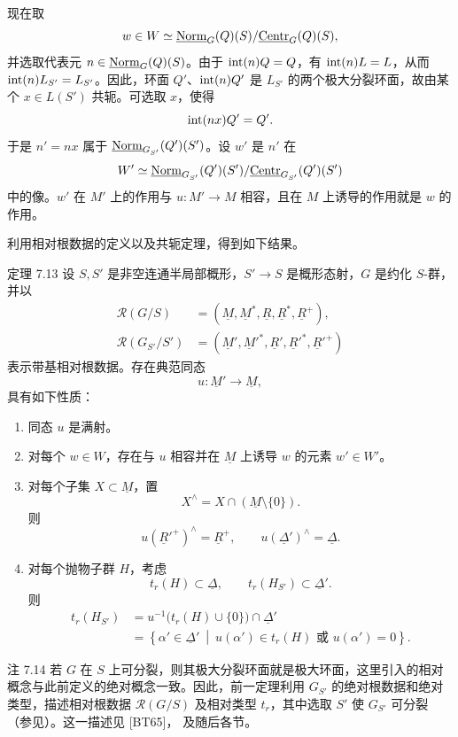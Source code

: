 现在取
\[
 w\in W\simeq\underline{\operatorname{Norm}}_G(Q)(S)/\underline{\operatorname{Centr}}_G(Q)(S),
\]
并选取代表元 \(n\in\underline{\operatorname{Norm}}_G(Q)(S)\)。由于 \(\operatorname{int}(n)Q=Q\)，有 \(\operatorname{int}(n)L=L\)，从而 \(\operatorname{int}(n)L_{S'}=L_{S'}\)。因此，环面 \(Q'\)、\(\operatorname{int}(n)Q'\) 是 \(L_{S'}\) 的两个极大分裂环面，故由某个 \(x\in L(S')\) 共轭。可选取 \(x\)，使得
\[
 \operatorname{int}(nx)Q'=Q'.
\]
于是 \(n'=nx\) 属于 \(\underline{\operatorname{Norm}}_{G_{S'}}(Q')(S')\)。设 \(w'\) 是 \(n'\) 在
\[
 W'\simeq
 \underline{\operatorname{Norm}}_{G_{S'}}(Q')(S')/\underline{\operatorname{Centr}}_{G_{S'}}(Q')(S')
\]
中的像。\(w'\) 在 \(M'\) 上的作用与 \(u:M'\to M\) 相容，且在 \(M\) 上诱导的作用就是 \(w\) 的作用。

利用相对根数据的定义以及共轭定理，得到如下结果。

\begin{sgastatement}{定理 7.13}
设 \(S,S'\) 是非空连通半局部概形，\(S'\to S\) 是概形态射，\(G\) 是约化 \(S\)-群，并以
\[
\begin{aligned}
 \mathcal R(G/S)
  &=(\underline M,\underline M^*,\underline R,
     \underline R^*,\underline R^+),\\
 \mathcal R(G_{S'}/S')
  &=(\underline M',\underline M'^*,\underline R',
     \underline R'^*,\underline R'^+)
\end{aligned}
\]
表示带基相对根数据。存在典范同态
\[
 u:\underline M'\longrightarrow\underline M,
\]
具有如下性质：
\begin{enumerate}[label=\textup{(\roman*)}]
\item 同态 \(u\) 是满射。
\item 对每个 \(w\in W\)，存在与 \(u\) 相容并在 \(\underline M\) 上诱导 \(w\) 的元素 \(w'\in W'\)。
\item 对每个子集 \(X\subset\underline M\)，置
\[
 X^\wedge=X\cap(\underline M\setminus\{0\}).
\]
则
\[
 u(\underline R'^+)^\wedge=\underline R^+,
 \qquad
 u(\underline\Delta')^\wedge=\underline\Delta.
\]
\item 对每个抛物子群 \(H\)，考虑
\[
 t_r(H)\subset\underline\Delta,
 \qquad
 t_r(H_{S'})\subset\underline\Delta'.
\]
则
\[
\begin{aligned}
 t_r(H_{S'})
 &=u^{-1}\bigl(t_r(H)\cup\{0\}\bigr)
       \cap\underline\Delta'\\
 &=\left\{\alpha'\in\underline\Delta'
       \ \middle|\ 
       u(\alpha')\in t_r(H)\text{ 或 }u(\alpha')=0
   \right\}.
\end{aligned}
\]
\end{enumerate}
\end{sgastatement}

\begin{sgastatement}{注 7.14}
若 \(G\) 在 \(S\) 上可分裂，则其极大分裂环面就是极大环面，这里引入的相对概念与此前定义的绝对概念一致。因此，前一定理利用 \(G_{S'}\) 的绝对根数据和绝对类型，描述相对根数据 \(\mathcal R(G/S)\) 及相对类型 \(t_r\)，其中选取 \(S'\) 使 \(G_{S'}\) 可分裂 \textup{（参见）}。这一描述见 \textup{[BT65]}， 及随后各节。
\end{sgastatement}

